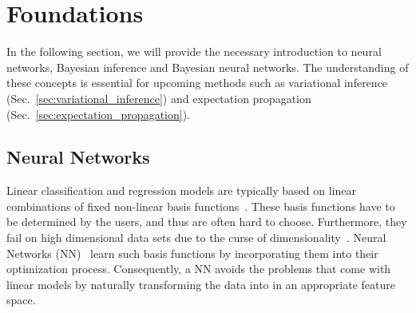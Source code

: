 \documentclass[runningheads]{llncs}
\begin{document}
\section{Foundations}
\label{sec:foundation}
In the following section, we will provide the necessary introduction to neural networks, Bayesian inference and Bayesian neural networks.
The understanding of these concepts is essential for upcoming methods such as variational inference (Sec.~\ref{sec:variational_inference}) and expectation propagation (Sec.~\ref{sec:expectation_propagation}). %

\subsection{Neural Networks}
\label{sec:neural_networks}
Linear classification and regression models are typically based on linear combinations of fixed non-linear basis functions~\cite{bishop:2006:PRML}.
These basis functions have to be determined by the users, and thus are often hard to choose. 
Furthermore, they fail on high dimensional data sets due to the curse of dimensionality~\cite{bishop:2006:PRML}.
Neural Networks (NN)~\cite{HaykinNeuralNetworks} learn such basis functions by incorporating them into their optimization process. 
Consequently, a NN avoids the problems that come with linear models by naturally transforming the data into in an appropriate feature space.
\end{document}
